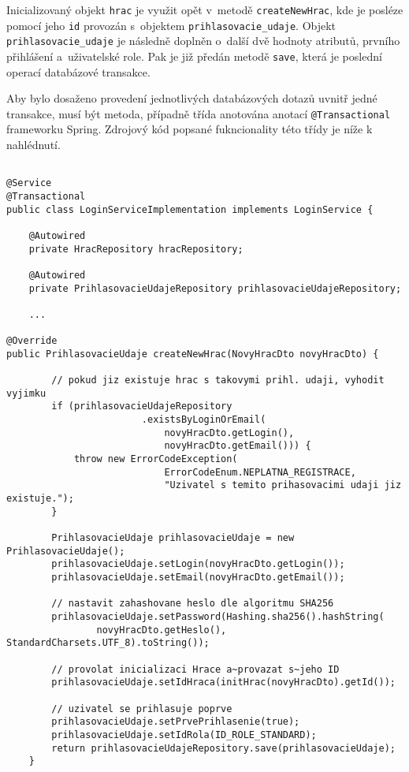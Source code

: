 \documentclass[twoside, 12pt]{article}
\begin{document}
{Inicializovaný objekt \texttt{hrac} je využit opět v~metodě \texttt{createNewHrac},
kde je posléze pomocí jeho \texttt{id} provozán s~objektem \texttt{prihlasovacie\_udaje}.
Objekt \texttt{prihlasovacie\_udaje} je následně doplněn o~další dvě hodnoty atributů, prvního přihlášení a~uživatelské role.
Pak je již předán metodě \texttt{save}, která je poslední operací databázové transakce.

Aby bylo dosaženo provedení jednotlivých databázových dotazů uvnitř jedné transakce,
musí být metoda, případně třída anotována anotací \texttt{@Transactional}
frameworku Spring. Zdrojový kód popsané fukncionality této třídy je níže k nahlédnutí.


\clearpage

\begin{lstlisting}

@Service
@Transactional
public class LoginServiceImplementation implements LoginService {

    @Autowired
    private HracRepository hracRepository;

    @Autowired
    private PrihlasovacieUdajeRepository prihlasovacieUdajeRepository;

    ...

@Override
public PrihlasovacieUdaje createNewHrac(NovyHracDto novyHracDto) {

        // pokud jiz existuje hrac s takovymi prihl. udaji, vyhodit vyjimku
        if (prihlasovacieUdajeRepository
                        .existsByLoginOrEmail(
                            novyHracDto.getLogin(),
                            novyHracDto.getEmail())) {
            throw new ErrorCodeException(
                            ErrorCodeEnum.NEPLATNA_REGISTRACE,
                            "Uzivatel s temito prihasovacimi udaji jiz existuje.");
        }

        PrihlasovacieUdaje prihlasovacieUdaje = new PrihlasovacieUdaje();
        prihlasovacieUdaje.setLogin(novyHracDto.getLogin());
        prihlasovacieUdaje.setEmail(novyHracDto.getEmail());

        // nastavit zahashovane heslo dle algoritmu SHA256
        prihlasovacieUdaje.setPassword(Hashing.sha256().hashString(
                novyHracDto.getHeslo(), StandardCharsets.UTF_8).toString());

        // provolat inicializaci Hrace a~provazat s~jeho ID
        prihlasovacieUdaje.setIdHraca(initHrac(novyHracDto).getId());

        // uzivatel se prihlasuje poprve
        prihlasovacieUdaje.setPrvePrihlasenie(true);
        prihlasovacieUdaje.setIdRola(ID_ROLE_STANDARD);
        return prihlasovacieUdajeRepository.save(prihlasovacieUdaje);
    }


\end{lstlisting}}
\end{document}
